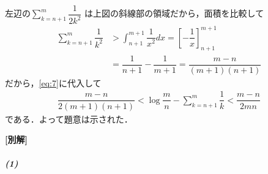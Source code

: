 \documentclass[../../main.tex]{subfiles}
\begin{document}
左辺の$\sum_{k=n+1}^{m} \dfrac{1}{2k^2}$ は上図の斜線部の領域だから，面積を比較して
\begin{align}
  \sum_{k=n+1}^{m} \dfrac{1}{k^2}
  &> \int_{n+1}^{m+1} \dfrac{1}{x^2} dx
  = \left[ -\dfrac{1}{x} \right]_{n+1}^{m+1} \\
  &= \dfrac{1}{n+1} - \dfrac{1}{m+1}
  = \dfrac{m-n}{(m+1)(n+1)}
\end{align}
だから，\cref{eq:7}に代入して
\begin{align}
  \dfrac{m-n}{2(m+1)(n+1)}
  < \log\dfrac{m}{n} - \sum_{k=n+1}^{m} \dfrac{1}{k}
  < \dfrac{m-n}{2mn}
\end{align}
である．よって題意は示された．

{\bf [別解]}

\subparagraph{(1)}

\end{document}
